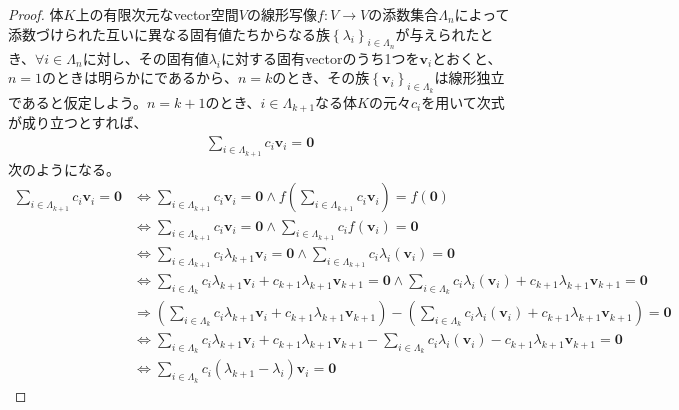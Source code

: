 \documentclass[dvipdfmx]{jsarticle}
\begin{document}
\begin{proof}
体$K$上の有限次元なvector空間$V$の線形写像$f:V \rightarrow V$の添数集合$\varLambda_{n}$によって添数づけられた互いに異なる固有値たちからなる族$\left\{ \lambda_{i} \right\}_{i \in \varLambda_{n}}$が与えられたとき、$\forall i \in \varLambda_{n}$に対し、その固有値$\lambda_{i}$に対する固有vectorのうち1つを$\mathbf{v}_{i}$とおくと、$n = 1$のときは明らかにであるから、$n = k$のとき、その族$\left\{ \mathbf{v}_i \right\}_{i \in \varLambda_{k}}$は線形独立であると仮定しよう。$n = k + 1$のとき、$i \in \varLambda_{k + 1}$なる体$K$の元々$c_{i}$を用いて次式が成り立つとすれば、
\begin{align*}
\sum_{i \in \varLambda_{k + 1}} {c_{i}\mathbf{v}_{i}} = \mathbf{0}
\end{align*}
次のようになる。
\begin{align*}
\sum_{i \in \varLambda_{k + 1}} {c_{i}\mathbf{v}_{i}} = \mathbf{0} &\Leftrightarrow \sum_{i \in \varLambda_{k + 1}} {c_{i}\mathbf{v}_{i}} = \mathbf{0} \land f\left( \sum_{i \in \varLambda_{k + 1}} {c_{i}\mathbf{v}_{i}} \right) = f\left( \mathbf{0} \right)\\
&\Leftrightarrow \sum_{i \in \varLambda_{k + 1}} {c_{i}\mathbf{v}_{i}} = \mathbf{0} \land \sum_{i \in \varLambda_{k + 1}} {c_{i}f\left( \mathbf{v}_{i} \right)} = \mathbf{0}\\
&\Leftrightarrow \sum_{i \in \varLambda_{k + 1}} {c_{i}\lambda_{k + 1}\mathbf{v}_{i}} = \mathbf{0} \land \sum_{i \in \varLambda_{k + 1}} {c_{i}\lambda_{i}\left( \mathbf{v}_{i} \right)} = \mathbf{0}\\
&\Leftrightarrow \sum_{i \in \varLambda_{k}} {c_{i}\lambda_{k + 1}\mathbf{v}_{i}} + c_{k + 1}\lambda_{k + 1}\mathbf{v}_{k + 1} = \mathbf{0} \land \sum_{i \in \varLambda_{k}} {c_{i}\lambda_{i}\left( \mathbf{v}_{i} \right)} + c_{k + 1}\lambda_{k + 1}\mathbf{v}_{k + 1} = \mathbf{0}\\
&\Rightarrow \left( \sum_{i \in \varLambda_{k}} {c_{i}\lambda_{k + 1}\mathbf{v}_{i}} + c_{k + 1}\lambda_{k + 1}\mathbf{v}_{k + 1} \right) - \left( \sum_{i \in \varLambda_{k}} {c_{i}\lambda_{i}\left( \mathbf{v}_{i} \right)} + c_{k + 1}\lambda_{k + 1}\mathbf{v}_{k + 1} \right) = \mathbf{0}\\
&\Leftrightarrow \sum_{i \in \varLambda_{k}} {c_{i}\lambda_{k + 1}\mathbf{v}_{i}} + c_{k + 1}\lambda_{k + 1}\mathbf{v}_{k + 1} - \sum_{i \in \varLambda_{k}} {c_{i}\lambda_{i}\left( \mathbf{v}_{i} \right)} - c_{k + 1}\lambda_{k + 1}\mathbf{v}_{k + 1} = \mathbf{0}\\
&\Leftrightarrow \sum_{i \in \varLambda_{k}} {c_{i}\left( \lambda_{k + 1} - \lambda_{i} \right)\mathbf{v}_{i}} = \mathbf{0}

\end{align*}
\end{proof}
\end{document}
